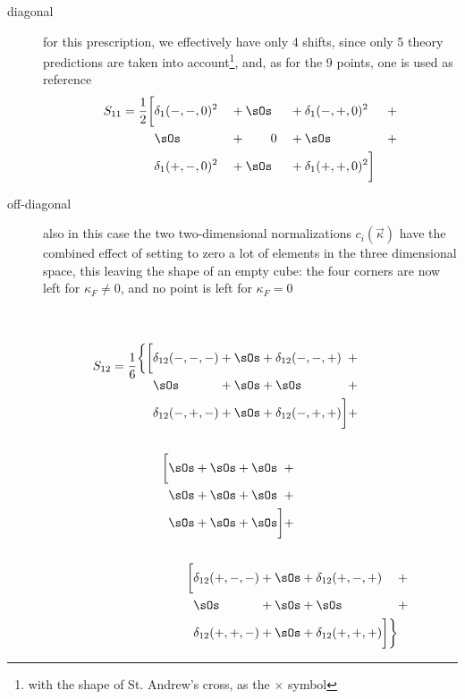 \begin{description}
    \item[diagonal] for this prescription, we effectively have only 4 shifts,
        since only 5 theory predictions are taken into account\footnote{
            with the shape of St. Andrew's cross, as the $\times$ symbol
        }, and, as for the 9 points, one is used as reference
        \begin{alignat}{4}
            S_{11} = \frac{1}{2} \bigg[ \nonumber
                &\delta_1(-,-,0)^2 &&+ \sOs &&+ \delta_1(-,+,0)^2 &&+\\
                &\sOs &&+ \qquad0 &&+ \sOs &&+\\
                &\delta_1(+,-,0)^2 &&+ \sOs &&+ \delta_1(+,+,0)^2
            \bigg] \nonumber
        \end{alignat}
    \item[off-diagonal] also in this case the two two-dimensional
        normalizations $c_i(\vec{\kappa})$ have the combined effect of setting
        to zero a lot of elements in the three dimensional space, this leaving
        the shape of an empty cube: the four corners are now left for $\kappa_F
        \neq 0$, and no point is left for $\kappa_F = 0$
        \vspace*{-30pt}
        \begin{align}
            S_{12} = \frac{1}{6} &
            \nonumber
            \begin{alignedat}{4}\\\\
                \bigg\{\bigg[
                    &\delta_{12}(-,-,-) &&+ \sOs &&+ \delta_{12}(-,-,+) &&+\\
                    &\sOs &&+ \sOs &&+ \sOs &&+\\
                    &\delta_{12}(-,+,-) &&+ \sOs &&+ \delta_{12}(-,+,+) 
            \bigg] &&+\\
        \end{alignedat}\\
        \nonumber\\
            &\qquad
            \begin{alignedat}{4}
                \bigg[
                    &\sOs &&+ \sOs &&+ \sOs &&+ \\
                    &\sOs &&+ \sOs &&+ \sOs &&+ \\
                    &\sOs &&+ \sOs &&+ \sOs 
                \bigg]&&+\\
            \end{alignedat}\\
            \nonumber\\
            \nonumber&\qquad\qquad
            \begin{alignedat}{4}
                \bigg[
                    &\delta_{12}(+,-,-) &&+ \sOs &&+ \delta_{12}(+,-,+) &&+\\
                    &\sOs &&+ \sOs &&+ \sOs &&+\\
                    &\delta_{12}(+,+,-) &&+ \sOs &&+ \delta_{12}(+,+,+) 
            \bigg]\bigg\}
            \end{alignedat}
        \end{align}
\end{description}

